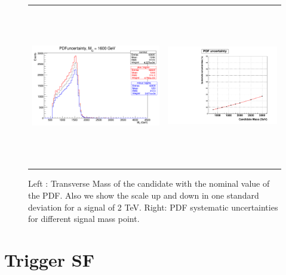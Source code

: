 \begin{figure}[!ht]
\caption{ Left : Transverse Mass of the candidate with the nominal value of the PDF. Also we show the scale up and down in one standard deviation for a signal of 2 TeV. Right: PDF systematic uncertainties for different signal mass point. }
\begin{tabular}{cc}
  \includegraphics[height=7cm,width=9cm]{figures/SystUncert/UncertPDF.png} &
\includegraphics[width=220pt]{figures/SystUncert/PDFuncert.pdf}\\
\end{tabular}
\label{fig:PDFuncert}
\end{figure}

\section{Trigger SF}

